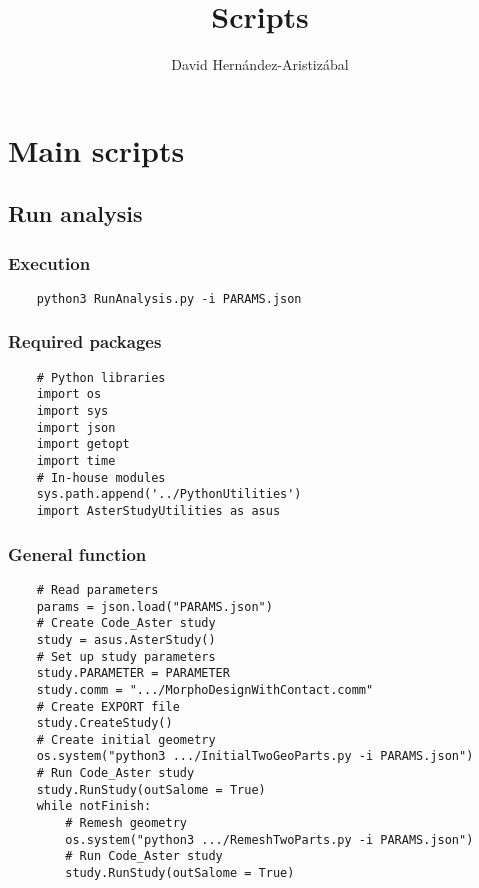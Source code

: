 \documentclass{article}
\title{Scripts}
\author{David Hernández-Aristizábal}
\begin{document}

\maketitle

\section{Main scripts}
\subsection{Run analysis}
\subsubsection{Execution}
\begin{verbatim}
    python3 RunAnalysis.py -i PARAMS.json
\end{verbatim}
\subsubsection{Required packages}
\begin{verbatim}
    # Python libraries
    import os
    import sys
    import json
    import getopt
    import time
    # In-house modules
    sys.path.append('../PythonUtilities')
    import AsterStudyUtilities as asus
\end{verbatim}
\subsubsection{General function}
\begin{verbatim}
    # Read parameters
    params = json.load("PARAMS.json")
    # Create Code_Aster study
    study = asus.AsterStudy()
    # Set up study parameters
    study.PARAMETER = PARAMETER
    study.comm = ".../MorphoDesignWithContact.comm"
    # Create EXPORT file
    study.CreateStudy()
    # Create initial geometry
    os.system("python3 .../InitialTwoGeoParts.py -i PARAMS.json")
    # Run Code_Aster study
    study.RunStudy(outSalome = True)
    while notFinish:
        # Remesh geometry
        os.system("python3 .../RemeshTwoParts.py -i PARAMS.json")
        # Run Code_Aster study
        study.RunStudy(outSalome = True)

\end{verbatim}
\end{document}
